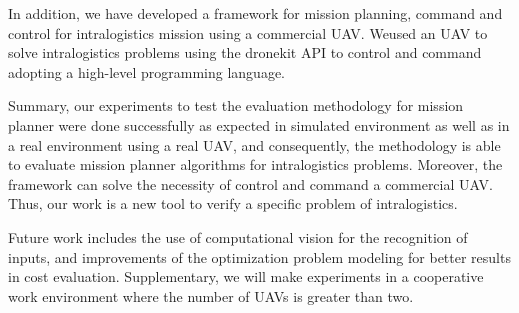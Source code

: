 \documentclass[conference,harvard,brazil,english]{sbatex}
\begin{document}
In addition, we have developed a framework for mission planning, command and control for intralogistics mission using a commercial UAV. Weused an UAV to solve intralogistics problems using the dronekit API to control and command adopting a high-level programming language.

Summary, our experiments to test the evaluation methodology for mission planner were done successfully as expected in simulated environment as well as in a real environment using a real UAV, and consequently, the methodology is able to evaluate mission planner algorithms for intralogistics problems. Moreover, the framework can solve the necessity of control and command a commercial UAV. Thus, our work is a new tool to verify a specific problem of intralogistics.

Future work includes the use of computational vision for the recognition of inputs, and improvements of the optimization problem modeling for better results in cost evaluation. Supplementary, we will make experiments in a cooperative work environment where the number of UAVs is greater than two.
\end{document}
